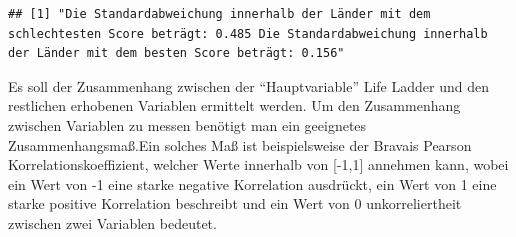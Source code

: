 \documentclass[
]{article}
\newenvironment{Shaded}{\begin{snugshade}}{\end{snugshade}}
\newcommand{\CommentTok}[1]{\textcolor[rgb]{0.56,0.35,0.01}{\textit{#1}}}
\newcommand{\DecValTok}[1]{\textcolor[rgb]{0.00,0.00,0.81}{#1}}
\newcommand{\FunctionTok}[1]{\textcolor[rgb]{0.13,0.29,0.53}{\textbf{#1}}}
\newcommand{\NormalTok}[1]{#1}
\newcommand{\OtherTok}[1]{\textcolor[rgb]{0.56,0.35,0.01}{#1}}
\newcommand{\SpecialCharTok}[1]{\textcolor[rgb]{0.81,0.36,0.00}{\textbf{#1}}}
\newcommand{\StringTok}[1]{\textcolor[rgb]{0.31,0.60,0.02}{#1}}
\begin{document}
\begin{Shaded}
\end{Shaded}

\begin{verbatim}
## [1] "Die Standardabweichung innerhalb der Länder mit dem schlechtesten Score beträgt: 0.485 Die Standardabweichung innerhalb der Länder mit dem besten Score beträgt: 0.156"
\end{verbatim}

Es soll der Zusammenhang zwischen der ``Hauptvariable'' Life Ladder und
den restlichen erhobenen Variablen ermittelt werden. Um den Zusammenhang
zwischen Variablen zu messen benötigt man ein geeignetes
Zusammenhangsmaß.Ein solches Maß ist beispielsweise der Bravais Pearson
Korrelationskoeffizient, welcher Werte innerhalb von {[}-1,1{]} annehmen
kann, wobei ein Wert von -1 eine starke negative Korrelation ausdrückt,
ein Wert von 1 eine starke positive Korrelation beschreibt und ein Wert
von 0 unkorreliertheit zwischen zwei Variablen bedeutet.
\end{document}
